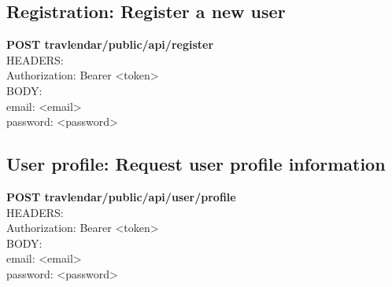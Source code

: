 \subsection{Registration: Register a new user}
\textbf{POST travlendar/public/api/register}\\
HEADERS:\\
Authorization: Bearer <token>\\
BODY:\\
email: <email>\\
password: <password>\\

\subsection{User profile: Request user profile information}
\textbf{POST travlendar/public/api/user/profile}\\
HEADERS:\\
Authorization: Bearer <token>\\
BODY:\\
email: <email>\\
password: <password>\\